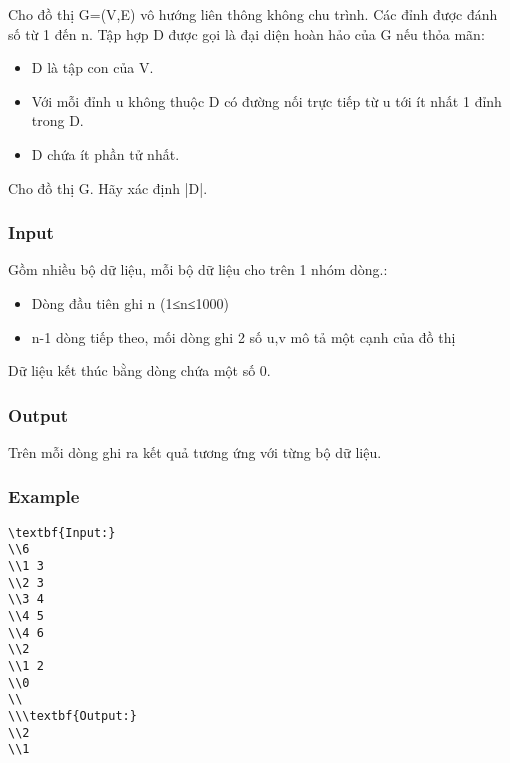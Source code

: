 



   Cho đồ thị G=(V,E) vô hướng liên thông không chu trình. Các đỉnh được đánh số từ 1 đến n. Tập hợp D được gọi là đại diện hoàn hảo của G nếu thỏa mãn:  
\begin{itemize}
	\item     D là tập con của V.   
	\item     Với mỗi đỉnh u không thuộc D có đường nối trực tiếp từ u tới ít nhất 1 đỉnh trong D.   
	\item     D chứa ít phần tử nhất.   
\end{itemize}

   Cho đồ thị G. Hãy xác định |D|.  

\subsubsection{   Input  }

   Gồm nhiều bộ dữ liệu, mỗi bộ dữ liệu cho trên 1 nhóm dòng.:  
\begin{itemize}
	\item     Dòng đầu tiên ghi n (1≤n≤1000)   
	\item     n-1 dòng tiếp theo, mối dòng ghi 2 số u,v mô tả một cạnh của đồ thị   
\end{itemize}

   Dữ liệu kết thúc bằng dòng chứa một số 0.  

\subsubsection{   Output  }

   Trên mỗi dòng ghi ra kết quả tương ứng với từng bộ dữ liệu.  

\subsubsection{   Example  }
\begin{verbatim}
\textbf{Input:}
\\6
\\1 3
\\2 3
\\3 4
\\4 5
\\4 6
\\2
\\1 2
\\0
\\
\\\textbf{Output:}
\\2
\\1\end{verbatim}